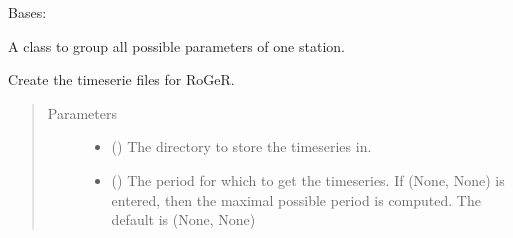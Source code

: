\documentclass[letterpaper,10pt,english]{sphinxmanual}
\begin{document}

\begin{fulllineitems}
\label{\detokenize{weatherDB:weatherDB.station.GroupStation}}
\sphinxAtStartPar
Bases: 

\sphinxAtStartPar
A class to group all possible parameters of one station.

\begin{fulllineitems}
\label{\detokenize{weatherDB:weatherDB.station.GroupStation.__init__}}
\end{fulllineitems}


\begin{fulllineitems}
\label{\detokenize{weatherDB:weatherDB.station.GroupStation.create_roger_ts}}
\sphinxAtStartPar
Create the timeserie files for RoGeR.
\begin{quote}\begin{description}
\item[{Parameters}] \leavevmode\begin{itemize}
\item {} 
\sphinxAtStartPar
{} () \textendash{} The directory to store the timeseries in.

\item {} 
\sphinxAtStartPar
{} (\sphinxstyleliteralemphasis{\sphinxupquote{, }}) \textendash{} The period for which to get the timeseries.
If (None, None) is entered, then the maximal possible period is computed.
The default is (None, None)


\end{itemize}
\end{description}
\end{quote}
\end{fulllineitems}
\end{fulllineitems}
\end{document}
